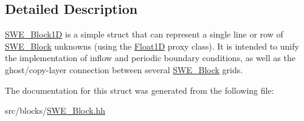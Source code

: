\subsection{Detailed Description}
\hyperlink{structSWE__Block1D}{S\-W\-E\-\_\-\-Block1\-D} is a simple struct that can represent a single line or row of \hyperlink{classSWE__Block}{S\-W\-E\-\_\-\-Block} unknowns (using the \hyperlink{classFloat1D}{Float1\-D} proxy class). It is intended to unify the implementation of inflow and periodic boundary conditions, as well as the ghost/copy-\/layer connection between several \hyperlink{classSWE__Block}{S\-W\-E\-\_\-\-Block} grids. 

The documentation for this struct was generated from the following file\-:\begin{DoxyCompactItemize}
\item 
src/blocks/\hyperlink{SWE__Block_8hh}{S\-W\-E\-\_\-\-Block.\-hh}\end{DoxyCompactItemize}
